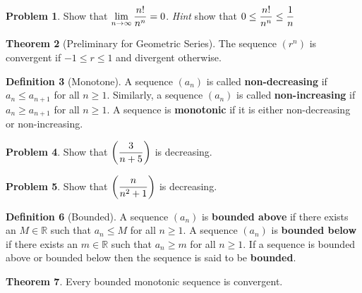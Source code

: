 \documentclass[letterpaper, twoside, 12pt]{book}
\theoremstyle{definition}
\newtheorem{theorem}{Theorem}
\theoremstyle{definition}
\newtheorem{definition}[theorem]{Definition}
\newtheorem{problem}[theorem]{Problem}
\newcommand{\ds}{\ensuremath{\displaystyle}}
\begin{document}
\newpage

\begin{problem}
 Show that $\ds \lim_{n \rightarrow \infty} \frac{n!}{n^n} = 0$.  \emph{Hint} show that $\ds 0 \leq \frac{n!}{n^n} \leq \frac{1}{n}$
\end{problem}

\vfill

\begin{theorem}[Preliminary for Geometric Series]
 The sequence $\left(r^n\right)$ is convergent if $-1 \leq r \leq 1$ and divergent otherwise.
\end{theorem}

\begin{definition}[Monotone]
 A sequence $\left(a_n\right)$ is called \textbf{non-decreasing} if $a_n \leq a_{n+1}$ for all $n \geq 1$.  Similarly, a sequence $\left(a_n\right)$ is called \textbf{non-increasing} if $a_n \geq a_{n+1}$ for all $n \geq 1$.  A sequence is \textbf{monotonic} if it is either non-decreasing or non-increasing.
\end{definition}

\begin{problem}
 Show that $\ds \left( \frac{3}{n+5} \right)$ is decreasing.
\end{problem}

\vfill

\newpage

\begin{problem}
 Show that $\ds \left( \frac{n}{n^2+1} \right)$ is decreasing.
\end{problem}

\vfill

\begin{definition}[Bounded]
 A sequence $\left( a_n \right)$ is \textbf{bounded above} if there exists an $M \in \mathbb{R}$ such that $a_n \leq M$ for all $n \geq 1$.  A sequence $\left( a_n \right)$ is \textbf{bounded below} if there exists an $m \in \mathbb{R}$ such that $a_n \geq m$ for all $n \geq 1$.  If a sequence is bounded above or bounded below then the sequence is said to be \textbf{bounded}.
\end{definition}


\begin{theorem}
 Every bounded monotonic sequence is convergent.
\end{theorem}
\end{document}
